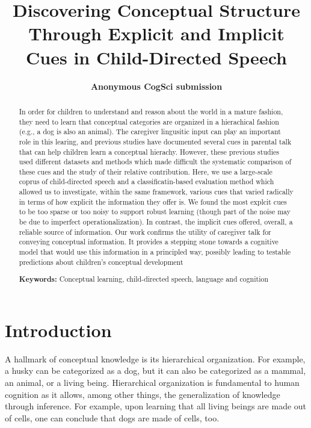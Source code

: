 \documentclass[10pt, letterpaper]{article}
\title{Discovering Conceptual Structure Through Explicit and Implicit Cues in
Child-Directed Speech}
\author{{\large \bf Anonymous CogSci submission}}
\begin{document}
\maketitle

\begin{abstract}
In order for children to understand and reason about the world in a
mature fashion, they need to learn that conceptual categories are
organized in a hierachical fashion (e.g., a dog is also an animal). The
caregiver lingusitic input can play an important role in this learing,
and previous studies have documented several cues in parental talk that
can help children learn a conceptual hierachy. However, these previous
studies used different datasets and methods which made difficult the
systematic comparison of these cues and the study of their relative
contribution. Here, we use a large-scale coprus of child-directed speech
and a classificatin-based evaluation method which allowed us to
investigate, within the same framework, various cues that varied
radically in terms of how explicit the information they offer is. We
found the most explcit cues to be too sparse or too noisy to support
robust learning (though part of the noise may be due to imperfect
operationalization). In contrast, the implicit cues offered, overall, a
reliable source of information. Our work confirms the utility of
caregiver talk for conveying conceptual information. It provides a
stepping stone towards a cognitive model that would use this information
in a principled way, possibly leading to testable predictions about
children's conceptual development

\textbf{Keywords:}
Conceptual learning, child-directed speech, language and cognition
\end{abstract}

\hypertarget{introduction}{%
\section{Introduction}\label{introduction}}

A hallmark of conceptual knowledge is its hierarchical organization. For
example, a husky can be categorized as a dog, but it can also be
categorized as a mammal, an animal, or a living being. Hierarchical
organization is fundamental to human cognition as it allows, among other
things, the generalization of knowledge through inference. For example,
upon learning that all living beings are made out of cells, one can
conclude that dogs are made of cells, too.
\end{document}
